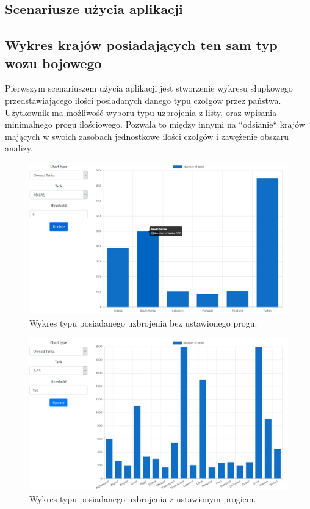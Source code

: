 \subsection{Scenariusze użycia aplikacji}
\subsection{Wykres krajów posiadających ten sam typ wozu bojowego}
Pierwszym scenariuszem użycia aplikacji jest stworzenie wykresu słupkowego przedstawiającego ilości posiadanych danego typu czołgów przez państwa. Użytkownik ma możliwość wyboru typu uzbrojenia z listy, oraz wpisania minimalnego progu ilościowego. Pozwala to między innymi na ``odsianie`` krajów mających w swoich zasobach jednostkowe ilości czołgów i zawężenie obszaru analizy.
\begin{figure}[H]
    \centering \includegraphics[width=0.9\linewidth]{tex/owned_tanks.PNG}
    \caption{Wykres typu posiadanego uzbrojenia bez ustawionego progu.}
    \label{fig:owned_tanks}
\end{figure}
\begin{figure}[H]
    \centering \includegraphics[width=0.8\linewidth]{tex/owned_tanks_treshold.PNG}
    \caption{Wykres typu posiadanego uzbrojenia z ustawionym progiem.}
    \label{fig:owned_tanks_treshold}
\end{figure}
\newpage
